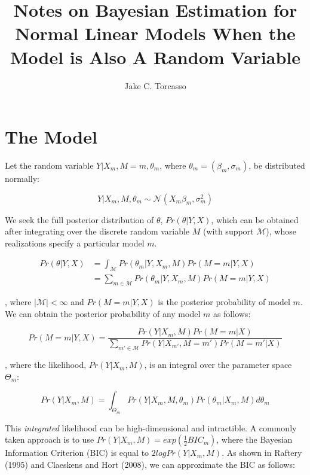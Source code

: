 \documentclass{article}
\title{Notes on Bayesian Estimation for Normal Linear Models
		When the Model is Also A Random Variable}
\author{Jake C. Torcasso}
\begin{document}
	\maketitle
	\clearpage

	\section{The Model}

	\noindent Let the random variable $Y|X_m,M=m,\theta_m$, where $\theta_m=(\beta_m,\sigma_m)$, be distributed normally:

	\begin{equation} \label{eq:model}
		Y|X_m,M,\theta_m \sim \mathcal{N}(X_m\beta_m, \sigma_m^2)
	\end{equation}

	\noindent We seek the full posterior distribution of $\theta$, $Pr(\theta|Y,X)$, which can be
	obtained after integrating over 
	the discrete random variable $M$ (with support $\mathcal{M}$), 
	whose realizations specify a particular model $m$.

	\begin{equation} \label{eq:posterior}
		\begin{aligned}
			Pr(\theta|Y,X) & = \int_{\mathcal{M}} Pr(\theta_m|Y, X_m, M)Pr(M=m|Y,X) \\
			               & = \sum_{m \in \mathcal{M}} Pr(\theta_m|Y, X_m, M)Pr(M=m|Y,X)
		\end{aligned}
	\end{equation}

	\noindent, where $|\mathcal{M}|< \infty$ and $Pr(M=m|Y,X)$ is the posterior probability of model $m$.
	We can obtain the posterior probability of any model $m$ as follows:

	\begin{equation}
		Pr(M=m|Y,X) = \frac{Pr(Y|X_m,M)Pr(M=m|X)}{\sum_{m' \in \mathcal{M}} Pr(Y|X_{m'},M=m')Pr(M = m'|X)}
	\end{equation}

	\noindent, where the likelihood, $Pr(Y|X_m,M)$, is an integral over the parameter space
	$\Theta_m$:

	\begin{equation} \label{eq:likelihood}
		Pr(Y|X_m, M) = \int_{\Theta_m} Pr(Y|X_m, M, \theta_m)Pr(\theta_m|X_m,M)d\theta_m
	\end{equation}

	\noindent This \emph{integrated} likelihood can be high-dimensional and intractible. A commonly
	taken approach is to use $Pr(Y|X_m,M) = exp(\frac{1}{2}BIC_m)$, where the Bayesian 
	Information Criterion (BIC) is equal to $2logPr(Y|X_m,M)$. As shown in Raftery (1995) and 
	Claeskens and Hort (2008), we can approximate the BIC as follows:
\end{document}

